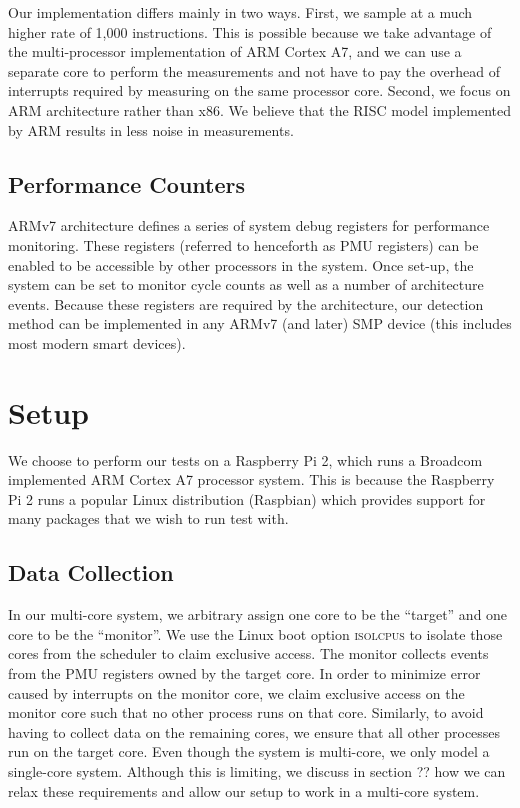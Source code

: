 \documentclass[letterpaper,twocolumn,10pt]{article}
\begin{document}
Our implementation differs mainly in two ways. First, we sample at a much higher rate of 1,000 
instructions. This is possible because we take advantage of the multi-processor 
implementation of ARM Cortex A7, and we can use a separate core to perform the measurements 
and not have to pay the overhead of interrupts required by measuring on the same processor core. 
Second, we focus on ARM architecture rather than x86. We believe that the RISC model 
implemented by ARM results in less noise in measurements.

\subsection*{Performance Counters}

ARMv7 architecture defines a series of system debug registers for performance monitoring\cite{ARMv7}. 
These registers (referred to henceforth as PMU registers) can be enabled to be accessible by other processors in the system. Once set-up, 
the system can be set to monitor cycle counts as well as a number of architecture events. Because these registers 
are required by the architecture, our detection method can be implemented in any ARMv7 (and 
later) SMP device (this includes most modern smart devices).

\section{Setup}

We choose to perform our tests on a Raspberry Pi 2, which runs a Broadcom implemented ARM Cortex A7 processor 
system\cite{RPI}. This is because the Raspberry Pi 2 runs a popular Linux distribution (Raspbian) which 
provides support for many packages that we wish to run test with.

\subsection*{Data Collection}

In our multi-core system, we arbitrary assign one core to be the ``target'' and one core to be the ``monitor''. 
We use the Linux boot option \textsc{isolcpus} to isolate those cores from the scheduler to claim 
exclusive access. The monitor collects events from the PMU registers owned by the target core. In order 
to minimize error caused by interrupts on the monitor core, we claim exclusive access on the monitor core 
such that no other process runs on that core. Similarly, to avoid having to collect data on the remaining 
cores, we ensure that all other processes run on the target core. Even though the system is multi-core, we 
only model a single-core system. Although this is limiting, we discuss in section ?? how we can relax 
these requirements and allow our setup to work in a multi-core system.
\end{document}
